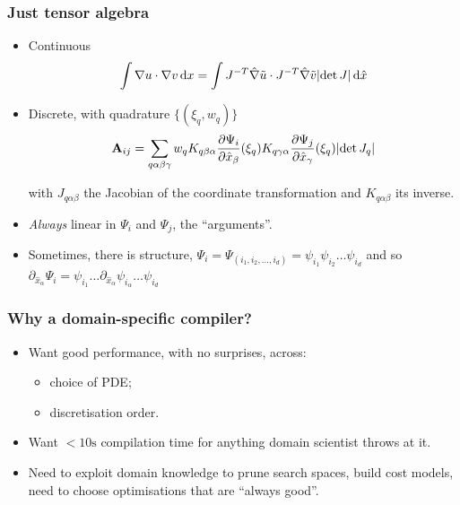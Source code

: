 \documentclass[presentation]{beamer}
\DeclarePairedDelimiter\abs{\lvert}{\rvert}%
\begin{document}
\begin{frame}
  \frametitle{Just tensor algebra}
  \begin{itemize}
  \item Continuous
    \begin{equation*}
      \int \nabla u \cdot \nabla v \,\text{d}x = \int J^{-T}\hat{\nabla}
      \tilde u \cdot J^{-T}\hat{\nabla} \tilde v \abs{\det J}\,\text{d}\hat{x}
    \end{equation*}
  \item Discrete, with quadrature $\{(\xi_q, w_q)\}$
    \begin{equation*}
      \mathbf{A}_{i j} = \sum_{q\alpha \beta \gamma} w_q K_{q\beta \alpha}
      \frac{\partial{\Psi_i}}{\partial \hat{x}_\beta}(\xi_{q})
      K_{q\gamma \alpha} \frac{\partial{\Psi_j}}{\partial \hat{x}_\gamma}(\xi_{q})
      \abs{\det J_q}
    \end{equation*}

    with $J_{q\alpha\beta}$ the Jacobian of the coordinate transformation and
    $K_{q\alpha\beta}$ its inverse.
  \item \emph{Always} linear in $\Psi_i$ and $\Psi_j$, the ``arguments''.
  \item Sometimes, there is structure, $\Psi_i = \Psi_{(i_1,i_2,\dots,i_d)} =
    \psi_{i_1}\psi_{i_2}\dots\psi_{i_d}$ and so
    $\partial_{\hat{x}_\alpha}\Psi_i =
    \psi_{i_1}\dots\partial_{\hat{x}_\alpha}\psi_{i_\alpha}\dots\psi_{i_d}$
  \end{itemize}
\end{frame}

\begin{frame}
  \frametitle{Why a domain-specific compiler?}
  \begin{itemize}
  \item Want good performance, with no surprises, across:
    \begin{itemize}
    \item choice of PDE;
    \item discretisation order.
    \end{itemize}
  \item Want $<10\text{s}$ compilation time for anything domain
    scientist throws at it.
  \item Need to exploit domain knowledge to prune search spaces,
    build cost models, need to choose optimisations that are ``always
    good''.
  \end{itemize}
\end{frame}
\end{document}
